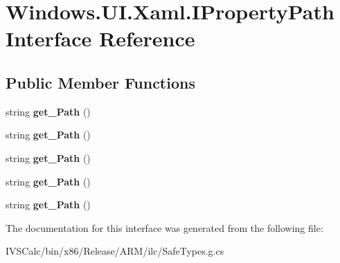 \hypertarget{interface_windows_1_1_u_i_1_1_xaml_1_1_i_property_path}{}\section{Windows.\+U\+I.\+Xaml.\+I\+Property\+Path Interface Reference}
\label{interface_windows_1_1_u_i_1_1_xaml_1_1_i_property_path}
\subsection*{Public Member Functions}
\begin{DoxyCompactItemize}
\item 
\mbox{\label{interface_windows_1_1_u_i_1_1_xaml_1_1_i_property_path_a72a376afb47756db5588b3dd32ff8ded}} 
string {\bfseries get\+\_\+\+Path} ()
\item 
\mbox{\label{interface_windows_1_1_u_i_1_1_xaml_1_1_i_property_path_a72a376afb47756db5588b3dd32ff8ded}} 
string {\bfseries get\+\_\+\+Path} ()
\item 
\mbox{\label{interface_windows_1_1_u_i_1_1_xaml_1_1_i_property_path_a72a376afb47756db5588b3dd32ff8ded}} 
string {\bfseries get\+\_\+\+Path} ()
\item 
\mbox{\label{interface_windows_1_1_u_i_1_1_xaml_1_1_i_property_path_a72a376afb47756db5588b3dd32ff8ded}} 
string {\bfseries get\+\_\+\+Path} ()
\item 
\mbox{\label{interface_windows_1_1_u_i_1_1_xaml_1_1_i_property_path_a72a376afb47756db5588b3dd32ff8ded}} 
string {\bfseries get\+\_\+\+Path} ()
\end{DoxyCompactItemize}


The documentation for this interface was generated from the following file\+:\begin{DoxyCompactItemize}
\item 
I\+V\+S\+Calc/bin/x86/\+Release/\+A\+R\+M/ilc/Safe\+Types.\+g.\+cs\end{DoxyCompactItemize}
